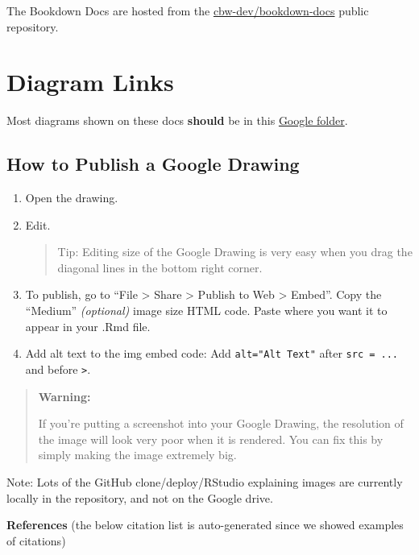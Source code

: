 \documentclass[
]{book}
\theoremstyle{definition}
\theoremstyle{definition}
\theoremstyle{definition}
\theoremstyle{definition}
\theoremstyle{remark}
\begin{document}
The Bookdown Docs are hosted from the \href{https://github.com/cbw-dev/bookdown-docs}{cbw-dev/bookdown-docs} public repository.

\section{Diagram Links}\label{diagram-links}

Most diagrams shown on these docs \textbf{should} be in this \href{https://drive.google.com/drive/folders/136sy6WIiSG3tBFVpHt8yQwLakB4TFJvn?usp=sharing}{Google folder}.

\subsection{How to Publish a Google Drawing}\label{publish-google-draw}

\begin{enumerate}
\def\labelenumi{\arabic{enumi}.}
\item
  Open the drawing.
\item
  Edit.

  \begin{quote}
  Tip: Editing size of the Google Drawing is very easy when you drag the diagonal lines in the bottom right corner.
  \end{quote}
\item
  To publish, go to ``File \textgreater{} Share \textgreater{} Publish to Web \textgreater{} Embed''. Copy the ``Medium'' \emph{(optional)} image size HTML code. Paste where you want it to appear in your .Rmd file.
\item
  Add alt text to the img embed code: Add \texttt{alt="Alt\ Text"} after \texttt{src\ =\ ...} and before \texttt{\textgreater{}}.
\end{enumerate}

\begin{quote}
\textbf{Warning:}

If you're putting a screenshot into your Google Drawing, the resolution of the image will look very poor when it is rendered. You can fix this by simply making the image extremely big.
\end{quote}

Note: Lots of the GitHub clone/deploy/RStudio explaining images are currently locally in the repository, and not on the Google drive.

\textbf{References} (the below citation list is auto-generated since we showed examples of citations)

  
\end{document}

